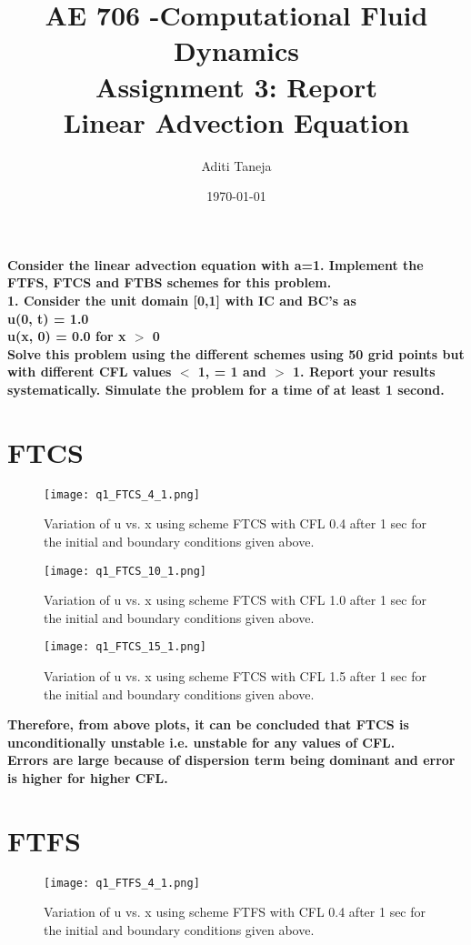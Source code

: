 \documentclass{article}
\title{\textbf{AE 706 -Computational Fluid Dynamics \\ Assignment 3: Report \\ Linear Advection Equation}}
\author{Aditi Taneja}
\date{\today}
\begin{document}
\maketitle

\textbf{}
\textbf{}
\newpage
\textbf{Consider the linear advection equation with a=1.  Implement the FTFS, FTCS and FTBS schemes for this problem.
\\1. Consider the unit domain [0,1] with IC and BC's as
\\u(0, t) = 1.0
\\u(x, 0) = 0.0 for x $>$ 0
\\Solve this problem using the different schemes using 50 grid points but with different CFL values $<$ 1, = 1 and $>$ 1.  Report your results systematically.  Simulate the problem for a time of at least 1 second.}

\section*{FTCS}
\begin{figure}[H] \label{figure}
\texttt{[image: q1\_FTCS\_4\_1.png]}
\caption{Variation of u vs. x using scheme FTCS with CFL 0.4 after 1 sec for the initial and boundary conditions given above.}
\label{figure:}
\end{figure}

\begin{figure}[H] \label{figure}
\texttt{[image: q1\_FTCS\_10\_1.png]}
\caption{Variation of u vs. x using scheme FTCS with CFL 1.0 after 1 sec for the initial and boundary conditions given above.}
\label{figure:}
\end{figure}

\begin{figure}[H] \label{figure}
\texttt{[image: q1\_FTCS\_15\_1.png]}
\caption{Variation of u vs. x using scheme FTCS with CFL 1.5 after 1 sec for the initial and boundary conditions given above.}
\label{figure:}
\end{figure}

\textbf{Therefore, from above plots, it can be concluded that FTCS is unconditionally unstable i.e. unstable for any values of CFL.
\\ Errors are large because of dispersion term being dominant and error is higher for higher CFL.}

\newpage
\section*{FTFS}
\begin{figure}[H] \label{figure}
\texttt{[image: q1\_FTFS\_4\_1.png]}
\caption{Variation of u vs. x using scheme FTFS with CFL 0.4 after 1 sec for the initial and boundary conditions given above.}
\label{figure:}
\end{figure}
\end{document}

